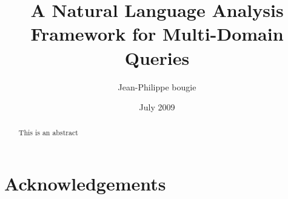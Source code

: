 \documentclass[a4paper]{report}
\begin{document}
\onehalfspacing

\title{A Natural Language Analysis Framework for Multi-Domain Queries}
\author{Jean-Philippe bougie}
\date{July 2009}

\maketitle

\tableofcontents
\listoffigures
\listoftables

\chapter*{Acknowledgements}

\begin{abstract}
  This is an abstract
\end{abstract}

















\end{document}
